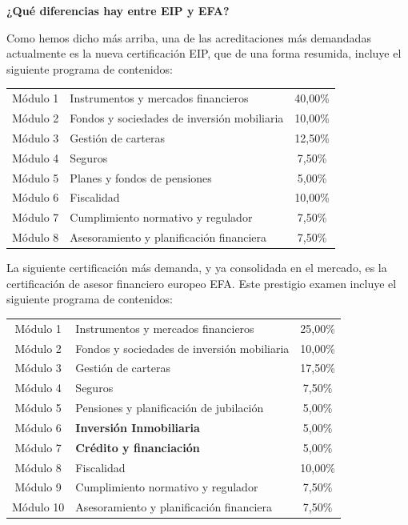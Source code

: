 \documentclass[
  letterpaper,
  DIV=11,
  numbers=noendperiod]{scrreprt}
\begin{document}
\textbf{¿Qué diferencias hay entre EIP y EFA?}

Como hemos dicho más arriba, una de las acreditaciones más demandadas
actualmente es la nueva certificación EIP, que de una forma resumida,
incluye el siguiente programa de contenidos:

\begin{longtable}[]{@{}clc@{}}
\toprule()
\endhead
Módulo 1 & Instrumentos y mercados financieros & 40,00\% \\
Módulo 2 & Fondos y sociedades de inversión mobiliaria & 10,00\% \\
Módulo 3 & Gestión de carteras & 12,50\% \\
Módulo 4 & Seguros & 7,50\% \\
Módulo 5 & Planes y fondos de pensiones & 5,00\% \\
Módulo 6 & Fiscalidad & 10,00\% \\
Módulo 7 & Cumplimiento normativo y regulador & 7,50\% \\
Módulo 8 & Asesoramiento y planificación financiera & 7,50\% \\
\bottomrule()
\end{longtable}

La siguiente certificación más demanda, y ya consolidada en el mercado,
es la certificación de asesor financiero europeo EFA. Este prestigio
examen incluye el siguiente programa de contenidos:

\begin{longtable}[]{@{}clc@{}}
\toprule()
\endhead
Módulo 1 & Instrumentos y mercados financieros & 25,00\% \\
Módulo 2 & Fondos y sociedades de inversión mobiliaria & 10,00\% \\
Módulo 3 & Gestión de carteras & 17,50\% \\
Módulo 4 & Seguros & 7,50\% \\
Módulo 5 & Pensiones y planificación de jubilación & 5,00\% \\
Módulo 6 & \textbf{Inversión Inmobiliaria} & 5,00\% \\
Módulo 7 & \textbf{Crédito y financiación} & 5,00\% \\
Módulo 8 & Fiscalidad & 10,00\% \\
Módulo 9 & Cumplimiento normativo y regulador & 7,50\% \\
Módulo 10 & Asesoramiento y planificación financiera & 7,50\% \\
\bottomrule()
\end{longtable}
\end{document}
